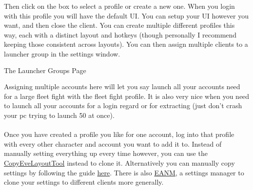\documentclass{article}
\begin{document}
Then click on the box to select a profile or create a new one. When you login with this profile you will have the default UI. You can setup
your UI however you want, and then close the client. You can create multiple different profiles this way, each with a distinct layout and 
hotkeys (though personally I recommend keeping those consistent across layouts). You can then assign multiple clients to a launcher group in 
the settings window.
\\
\begin{center}
  The Launcher Groups Page 
\end{center}
Assigning multiple accounts here will let you say launch all your accounts need for a large fleet fight with the fleet fight profile. It is
also very nice when you need to launch all your accounts for a login regard or for extracting (just don't crash your pc trying to launch 50
at once).
\\
\\
Once you have created a profile you like for one account, log into that profile with every other character and account you want to add it to.
Instead of manually setting everything up every time however, you can use the \href{https://github.com/kshannoninnes/CopyEveLayoutTool}{CopyEveLayoutTool}
instead to clone it. Alternatively you can manually copy settings by following the guide \href{https://forums.eveonline.com/t/manually-copy-settings-between-characters-and-accounts/32704}{here}.
There is also \href{https://github.com/FontaineRiant/EANM}{EANM}, a settings manager to clone your settings to different clients more generally.


\clearpage
\end{document}

